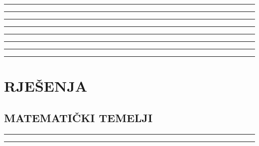 \documentclass[10pt]{book}
\newcounter{zadatak} %
\newcounter{cjelina}
\begin{document}
\vspace{1cm}

\noindent
{\color{boja} \rule{\linewidth}{0.3mm} }


\vspace{1cm}

\noindent
{\color{boja} \rule{\linewidth}{0.3mm} }


\setcounter{zadatak}{0}

\vspace{1cm}

\noindent
{\color{boja} \rule{\linewidth}{0.3mm} }

\vspace{0.2cm} 



\noindent
{\color{boja} \rule{\linewidth}{0.3mm} }

\vspace{0.2cm}




\noindent
{\color{boja} \rule{\linewidth}{0.3mm} }





\noindent
{\color{boja} \rule{\linewidth}{0.3mm} }


\vspace{1cm}

\noindent
{\color{boja} \rule{\linewidth}{0.3mm} }


\vspace{1cm}

\noindent
{\color{boja} \rule{\linewidth}{0.3mm} }


\chapter{RJEŠENJA}
\section{MATEMATIČKI TEMELJI}


{\color{boja} \rule{\linewidth}{0.3mm} }



{\color{boja} \rule{\linewidth}{0.3mm} }

\end{document}
